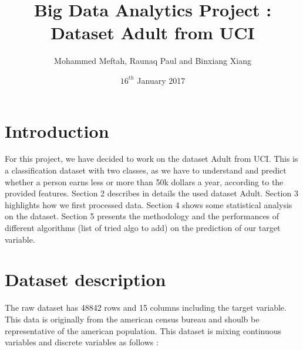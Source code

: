 \documentclass[11pt]{article}
\title{Big Data Analytics Project : Dataset Adult from UCI }
\author{Mohammed Meftah, Raunaq Paul and Binxiang Xiang}
\date{$16^{th}$ January 2017}
\begin{document}
\maketitle
\tableofcontents

\newpage
\section{Introduction}
For this project, we have decided to work on the dataset Adult from UCI. This is a classification dataset with two classes, as we have to understand and predict whether a person earns less or more than 50k dollars a year, according to the provided features. Section 2 describes in details the used dataset Adult. Section 3 highlights how we first processed data. Section 4 shows some statistical analysis on the dataset. Section 5 presents the methodology and the performances of different algorithms (list of tried algo to add) on the prediction of our target variable. 

\section{Dataset description}
The raw dataset has 48842 rows and 15 columns including the target variable. This data is originally from the american census bureau and shoulb be representative of the american population. This dataset is mixing continuous variables and discrete variables as follows : 
\end{document}
